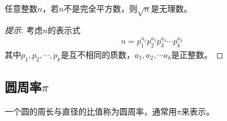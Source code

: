 \begin{question}
  任意整数$n$，若$n$不是完全平方数，则$\sqrt n$是无理数。
\end{question}
\begin{proof}[提示]
  考虑$n$的表示式
  \begin{align*}
    n=p_1^{a_1} p_2^{a_2} p_3^{a_3} \cdots p_k^{a_k}
  \end{align*}
  其中$p_1,p_2,\cdots,p_k$是互不相同的质数，$a_1,a_2,\cdots a_k$是正整数。
\end{proof}


\subsection{圆周率$\pi$}
\label{sec:constant-pi}

一个圆的周长与直径的比值称为圆周率，通常用$\pi$来表示。


